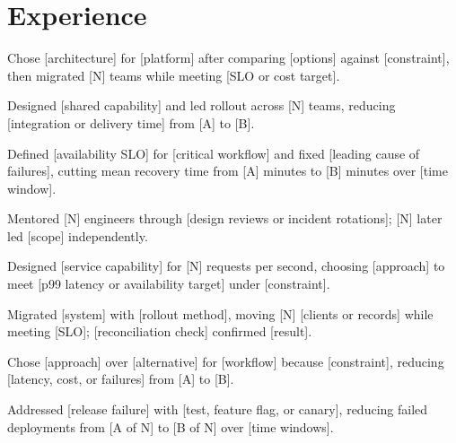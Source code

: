 \documentclass{resume}
\begin{document}

\section{Experience}

\begin{jobduties}
  \item Chose [architecture] for [platform] after comparing [options] against [constraint], then migrated [N] teams while meeting [SLO or cost target].
  \item Designed [shared capability] and led rollout across [N] teams, reducing [integration or delivery time] from [A] to [B].
  \item Defined [availability SLO] for [critical workflow] and fixed [leading cause of failures], cutting mean recovery time from [A] minutes to [B] minutes over [time window].
  \item Mentored [N] engineers through [design reviews or incident rotations]; [N] later led [scope] independently.
\end{jobduties}

\begin{jobduties}
  \item Designed [service capability] for [N] requests per second, choosing [approach] to meet [p99 latency or availability target] under [constraint].
  \item Migrated [system] with [rollout method], moving [N] [clients or records] while meeting [SLO]; [reconciliation check] confirmed [result].
  \item Chose [approach] over [alternative] for [workflow] because [constraint], reducing [latency, cost, or failures] from [A] to [B].
  \item Addressed [release failure] with [test, feature flag, or canary], reducing failed deployments from [A of N] to [B of N] over [time windows].
\end{jobduties}
\end{document}
